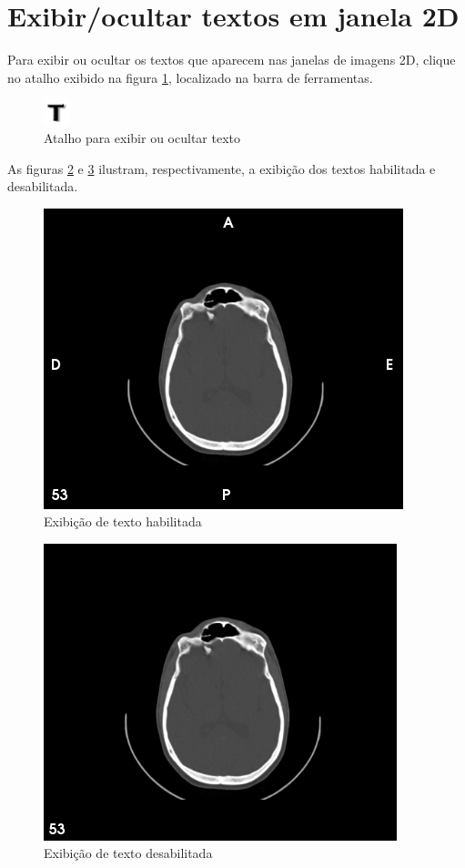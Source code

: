 \section{Exibir/ocultar textos em janela 2D}

Para exibir ou ocultar os textos que aparecem nas janelas de imagens 2D, clique no atalho
exibido na figura \ref{fig:text}, localizado na barra de ferramentas.

\begin{figure}[!htb]
\centering
\includegraphics[scale=0.7]{../user_guide_figures/icons/text.png}
\caption{Atalho para exibir ou ocultar texto}
\label{fig:text}
\end{figure}

As figuras \ref{fig:text_on} e \ref{fig:text_off} ilustram, respectivamente, a exibição
dos textos habilitada e desabilitada.

\begin{figure}[!htb]
\centering
\includegraphics[scale=0.5]{../user_guide_figures/invesalius_screen/text_on.png}
\caption{Exibição de texto habilitada}
\label{fig:text_on}
\end{figure}

\begin{figure}[!htb]
\centering
\includegraphics[scale=0.5]{../user_guide_figures/invesalius_screen/text_off.png}
\caption{Exibição de texto desabilitada}
\label{fig:text_off}
\end{figure}
